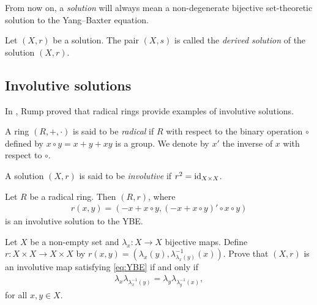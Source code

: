     \begin{convention}
        From now on, a \emph{solution}  will always mean a non-degenerate bijective set-theoretic solution to the Yang--Baxter equation.
    \end{convention}

    \begin{definition}
         Let $(X,r)$ be a solution. The pair $(X,s)$ is called the \emph{derived solution} of the solution $(X,r)$.
    \end{definition}



    \subsection{Involutive solutions}
    In \cite{MR2278047}, Rump proved that radical rings provide examples of involutive solutions.

    \begin{definition}
        A ring $(R,+,\cdot)$ is said to be \emph{radical} if $R$ with respect to the binary operation $\circ$ defined by $x\circ y=x+y+xy$ is a group. We denote by $x'$ the inverse of $x$ with respect to $\circ$.  
    \end{definition}
    
    \begin{definition}
        A solution $(X,r)$ is said to be \emph{involutive} if $r^2=\operatorname{id}_{X\times X}$.
    \end{definition}
    
    \begin{proposition}
        Let $R$ be a radical ring. Then $(R,r)$, where 
        \begin{align}\label{eq:solradical}
            r(x, y) = (-x + x\circ y, (-x + x \circ y)'\circ x\circ y)
        \end{align}
        is an involutive solution to the YBE.
    \end{proposition}

    \begin{exercise}\label{ex:involutive}
        Let $X$ be a non-empty set and $\lambda_x:X \to X$ bijective maps. Define $r:X\times X \to X \times X$ by $r(x,y)=(\lambda_x(y),\lambda^{-1}_{\lambda_x(y)}(x))$. Prove that $(X,r)$ is an involutive map satisfying \eqref{eq:YBE} if and only if 
        \begin{align*}
            \lambda_x\lambda_{\lambda^{-1}_x(y)} =\lambda_y\lambda_{\lambda^{-1}_y(x)},
        \end{align*}
        for all $x,y\in X$.
    \end{exercise}


